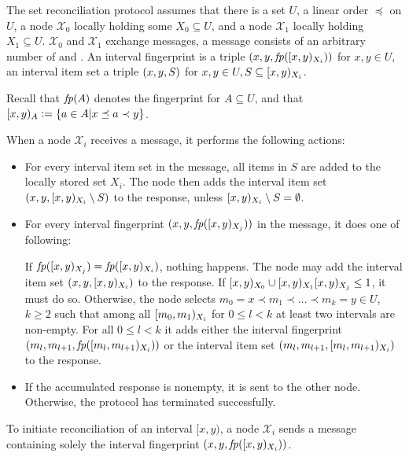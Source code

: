 The set reconciliation protocol assumes that there is a set $U$, a linear order $\preceq$ on $U$, a node $\mathcal{X}_0$ locally holding some $X_0 \subseteq U$, and a node $\mathcal{X}_1$ locally holding $X_1 \subseteq U$.
$\mathcal{X}_0$ and $\mathcal{X}_1$ exchange messages, a message consists of an arbitrary number of  and .
An interval fingerprint is a triple $({x}, {y}, {\mathit{fp}([{x},{y})_{X_i})})$ for $x, y \in U$, an interval item set a triple $({x}, {y}, {S})$ for $x, y \in U, S \subseteq [{x},{y})_{X_i}$.

Recall that $\mathit{fp}(A)$ denotes the fingerprint for $A \subseteq U$, and that $[{x},{y})_{A} \vcentcolon= \{a \in A | x \preceq a \prec y\}$.

When a node $\mathcal{X}_i$ receives a message, it performs the following actions:

\begin{itemize}
  \item For every interval item set  in the message, all items in $S$ are added to the locally stored set $X_i$. The node then adds the interval item set $({x}, {y}, {[{x},{y})_{X_i} \setminus S})$ to the response, unless $[{x},{y})_{X_i} \setminus S = \emptyset$.
  \item For every interval fingerprint $({x}, {y}, {\mathit{fp}([{x},{y})_{X_j})})$ in the message, it does one of following:
    \begin{caselist}
       \label{def-fingerprint-eq} If $\mathit{fp}([{x},{y})_{X_j}) = \mathit{fp}([{x},{y})_{X_i})$, nothing happens.
       \label{def-recursion-anchor} The node may add the interval item set $({x}, {y}, [{x},{y})_{X_i})$ to the response. If $[{x},{y})_{X_0} \cup [{x},{y})_{X_1}{[{x},{y})_{X_j}} \leq 1$, it must do so.
      \case[Recurse] \label{def-recurse} Otherwise, the node selects $m_0 = x \prec m_1 \prec \ldots \prec m_k = y \in U$, $k \geq 2$ such that among all $[{m_0},{m_1})_{X_i}$ for  $0 \leq l < k$ at least two intervals are non-empty. For all $0 \leq l < k$ it adds either the interval fingerprint $({m_l}, {m_{l + 1}}, {\mathit{fp}([{m_l},{m_{l + 1}})_{X_i})})$ or the interval item set $({m_l}, {m_{l + 1}}, [{m_l},{m_{l + 1}})_{X_i})$ to the response.
    \end{caselist}
  \item If the accumulated response is nonempty, it is sent to the other node. Otherwise, the protocol has terminated successfully.
\end{itemize}

To initiate reconciliation of an interval $[x, y)$, a node $\mathcal{X}_i$ sends a message containing solely the interval fingerprint $({x}, {y}, {\mathit{fp}([{x},{y})_{X_i})})$.

